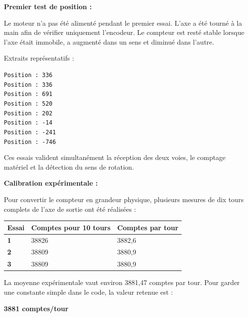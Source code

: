 \documentclass[11pt,a4paper]{article}
\begin{document}
\begin{sessionbox}
		\vspace{0.3cm}
		
		\textbf{Premier test de position :}
		
		Le moteur n'a pas été alimenté pendant le premier essai. L'axe a été tourné à la main afin de vérifier uniquement l'encodeur. Le compteur est resté stable lorsque l'axe était immobile, a augmenté dans un sens et diminué dans l'autre.
		
		Extraits représentatifs :
		
		\begin{center}
			\texttt{Position : 336}\\
			\texttt{Position : 336}\\
			\texttt{Position : 691}\\
			\texttt{Position : 520}\\
			\texttt{Position : 202}\\
			\texttt{Position : -14}\\
			\texttt{Position : -241}\\
			\texttt{Position : -746}
		\end{center}
		
		Ces essais valident simultanément la réception des deux voies, le comptage matériel et la détection du sens de rotation.
		
		\vspace{0.3cm}
		
		\textbf{Calibration expérimentale :}
		
		Pour convertir le compteur en grandeur physique, plusieurs mesures de dix tours complets de l'axe de sortie ont été réalisées :
		
		\begin{center}
			\begin{tabular}{>{\bfseries}p{3.5cm}p{4.5cm}p{4.5cm}}
				\toprule
				Essai & Comptes pour 10 tours & Comptes par tour \\
				\midrule
				1 & 38826 & 3882,6 \\
				2 & 38809 & 3880,9 \\
				3 & 38809 & 3880,9 \\
				\bottomrule
			\end{tabular}
		\end{center}
		
		La moyenne expérimentale vaut environ 3881,47 comptes par tour. Pour garder une constante simple dans le code, la valeur retenue est :
		
		\begin{center}
			\Large\textbf{3881 comptes/tour}
		\end{center}
		

\end{sessionbox}
\end{document}
